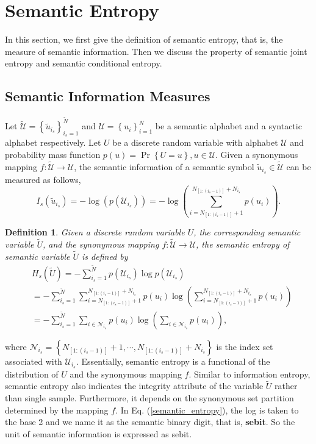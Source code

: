 \documentclass[12pt, draftclsnofoot,onecolumn]{IEEEtran}
\newtheorem{definition}{\bf{Definition}}
\begin{document}
\section{Semantic Entropy}
\label{section_III}
In this section, we first give the definition of semantic entropy, that is, the measure of semantic information. Then we discuss the property of semantic joint entropy and semantic conditional entropy.
\subsection{Semantic Information Measures}
Let $\tilde {\mathcal{U}}=\left\{\tilde{u}_{i_s}\right\}_{i_s=1}^{\tilde{N}}$ and $\mathcal{U}=\left\{u_i\right\}_{i=1}^{N}$ be a semantic alphabet and a syntactic alphabet respectively. Let $U$ be a discrete random variable with alphabet $\mathcal{U}$ and probability mass function $p(u)=\Pr\left\{U=u\right\},u\in\mathcal{U}$. Given a synonymous mapping $f: \tilde {\mathcal{U}} \to \mathcal{U}$, the semantic information of a semantic symbol $\tilde{u}_{i_s}\in \tilde {\mathcal{U}}$ can be measured as follows,
\begin{equation}
I_s\left(\tilde{u}_{i_s}\right)=-\log \left(p\left(\mathcal{U}_{i_s}\right)\right)=-\log \left(\sum_{i=N_{[1:(i_s-1)]}+1}^{N_{[1:(i_s-1)]}+N_{i_s}}p\left(u_i\right)\right).
\end{equation}
\begin{definition}
Given a discrete random variable $U$, the corresponding semantic variable $\tilde {U}$, and the synonymous mapping $f: \tilde{\mathcal{U}}\to\mathcal{U}$, the semantic entropy of semantic variable $\tilde {U}$ is defined by
\begin{equation}\label{semantic_entropy}
\begin{aligned}
&H_s(\tilde{U})=-\sum_{i_s=1}^{\tilde{N}}p\left(\mathcal{U}_{i_s}\right)\log p\left(\mathcal{U}_{i_s}\right) \\
&=-\sum_{i_s=1}^{\tilde{N}}\sum_{i=N_{[1:(i_s-1)]}+1}^{N_{[1:(i_s-1)]}+N_{i_s}}p\left(u_i\right) \log \left(\sum_{i=N_{[1:(i_s-1)]}+1}^{N_{[1:(i_s-1)]}+N_{i_s}}p\left(u_i\right)\right)\\
&=-\sum_{i_s=1}^{\tilde{N}}\sum_{i\in\mathcal{N}_{i_s}}p\left(u_i\right) \log \left(\sum_{i\in\mathcal{N}_{i_s}}p\left(u_i\right)\right),
\end{aligned}
\end{equation}
\end{definition}
where $\mathcal{N}_{i_s}=\left\{N_{[1:(i_s-1)]}+1,\cdots,N_{[1:(i_s-1)]}+N_{i_s}\right\}$ is the index set associated with $\mathcal{U}_{i_s}$.
Essentially, semantic entropy is a functional of the distribution of $U$ and the synonymous mapping $f$. Similar to information entropy, semantic entropy also indicates the integrity attribute of the variable $\tilde{U}$ rather than single sample. Furthermore, it depends on the synonymous set partition determined by the mapping $f$. In Eq. (\ref{semantic_entropy}), the log is taken to the base 2 and we name it as the semantic binary digit, that is, \textbf{sebit}. So the unit of semantic information is expressed as sebit.
\end{document}
